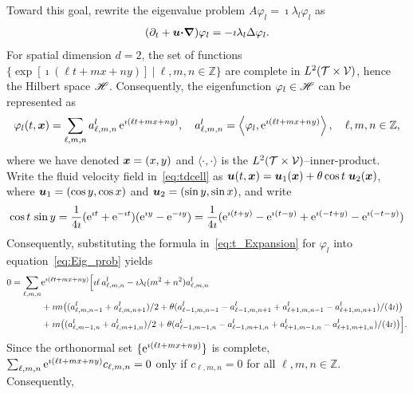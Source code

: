 \documentclass[amsa]{ipart}
\begin{document}
Toward this goal, rewrite the eigenvalue problem $A\varphi_l=\imath\lambda_l\varphi_l$ as         
%
\begin{align}\label{eq:Eig_prob}
  (\partial_t+\vecu \bcdot\bnabla )\varphi_l=-\imath\lambda_l\Delta\varphi_l.
\end{align}
%
For spatial dimension $d=2$, the set of functions
$\{\exp[\imath(\ell t+mx+ny)] \ |\  \ell,m,n\in\mathbb{Z}\}$ are 
complete in $L^2(\mathcal{T}\times\mathcal{V})$, hence the Hilbert space $\mathscr{H}$. Consequently,
the eigenfunction $\varphi_l\in\mathscr{H}$ can be represented as
%
\begin{align}\label{eq:t_Expansion}
  \varphi_l(t,\vecx)=\sum_{\ell,m,n} a^l_{\ell,m,n}\,\e^{\imath(\ell t+mx+ny)},
  \quad
  a^l_{\ell,m,n}=\left\langle\varphi_l,\e^{\imath(\ell t+mx+ny)}\right\rangle,
  \quad
  \ell,m,n\in\mathbb{Z},
\end{align}
%
where we have denoted $\boldsymbol{x}=(x,y)$ and $\langle\cdot,\cdot\rangle$ is the
$L^2(\mathcal{T}\times\mathcal{V})$--inner-product. Write the fluid velocity field
in~\eqref{eq:tdcell} as  
$\boldsymbol{u}(t,\boldsymbol{x})=\boldsymbol{u}_1(\boldsymbol{x})+\theta\cos{t}\;\boldsymbol{u}_2(\boldsymbol{x})$, where
$\boldsymbol{u}_1=(\cos{y},\cos{x})$ and $\boldsymbol{u}_2=(\sin{y},\sin{x})$, and write
%
\begin{align}
  \cos{t}\,\sin{y}=\frac{1}{4\imath}(\e^{\imath t}+\e^{-\imath t})(\e^{\imath y}-\e^{-\imath y})
                =\frac{1}{4\imath}(\e^{\imath (t+y)}-\e^{\imath (t-y)}+\e^{\imath (-t+y)}-\e^{\imath (-t-y)})
\end{align}
%
Consequently, substituting the formula in~\eqref{eq:t_Expansion} for $\varphi_l$
 into equation~\eqref{eq:Eig_prob} yields
%
\begin{align}\label{eq:Fourier_Cell_Problem}
 0=\sum_{\ell,m,n} &\e^{\imath(\ell t+mx+ny)}\Big[
     \imath\ell\,a^l_{\ell,m,n}-\imath\lambda_l(m^2+n^2)a^l_{\ell,m,n}
     \\\notag
     &+\imath m\big((a^l_{\ell,m,n-1}+a^l_{\ell,m,n+1})/2       
        +\theta (a^l_{\ell-1,m,n-1}-a^l_{\ell-1,m,n+1}+a^l_{\ell+1,m,n-1}-a^l_{\ell+1,m,n+1})/(4\imath)
        \big)
        \\\notag
     &+\imath n\big((a^l_{\ell,m-1,n}+a^l_{\ell,m+1,n})/2      
        +\theta(a^l_{\ell-1,m-1,n}-a^l_{\ell-1,m+1,n}+a^l_{\ell+1,m-1,n}-a^l_{\ell+1,m+1,n})/(4\imath)  
         \big)
 \Big].
 \notag
\end{align}
%
Since the orthonormal set $\{\mathrm{e}^{\imath(\ell t+mx+ny)}\}$ is complete,
$\sum_{\ell,m,n} \mathrm{e}^{\imath(\ell t+mx+ny)}c_{\ell,m,n}=0$ only if $c_{\ell,m,n}=0$ for all
$\ell,m,n\in\mathbb{Z}$. Consequently,
\end{document}
